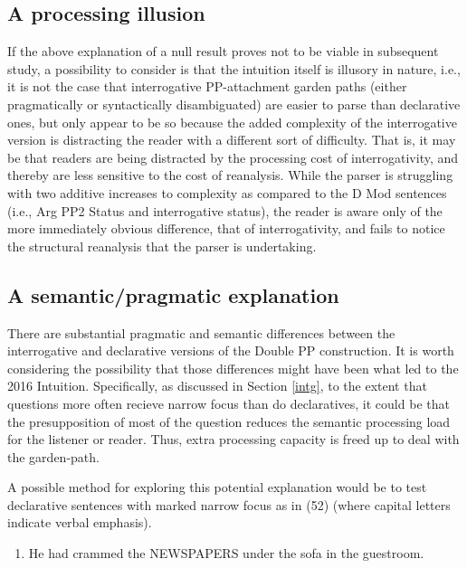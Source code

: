 \documentclass[11pt,oneside]{book}
\providecommand{\tightlist}{%
  \setlength{\itemsep}{0pt}\setlength{\parskip}{0pt}}
\begin{document}
\hypertarget{a-processing-illusion}{%
\subsection{A processing illusion}\label{a-processing-illusion}}

If the above explanation of a null result proves not to be viable in subsequent study, a possibility to consider is that the intuition itself is illusory in nature, i.e., it is not the case that interrogative PP-attachment garden paths (either pragmatically or syntactically disambiguated) are easier to parse than declarative ones, but only appear to be so because the added complexity of the interrogative version is distracting the reader with a different sort of difficulty. That is, it may be that readers are being distracted by the processing cost of interrogativity, and thereby are less sensitive to the cost of reanalysis. While the parser is struggling with two additive increases to complexity as compared to the D Mod sentences (i.e., Arg PP2 Status and interrogative status), the reader is aware only of the more immediately obvious difference, that of interrogativity, and fails to notice the structural reanalysis that the parser is undertaking.

\hypertarget{sem}{%
\subsection{A semantic/pragmatic explanation}\label{sem}}

There are substantial pragmatic and semantic differences between the interrogative and declarative versions of the Double PP construction. It is worth considering the possibility that those differences might have been what led to the 2016 Intuition. Specifically, as discussed in Section \ref{intg}, to the extent that questions more often recieve narrow focus than do declaratives, it could be that the presupposition of most of the question reduces the semantic processing load for the listener or reader. Thus, extra processing capacity is freed up to deal with the garden-path.

A possible method for exploring this potential explanation would be to test declarative sentences with marked narrow focus as in (52) (where capital letters indicate verbal emphasis).

\begin{enumerate}
\def\labelenumi{(\arabic{enumi})}
\setcounter{enumi}{51}
\tightlist
\item
  He had crammed the NEWSPAPERS under the sofa in the guestroom.
\end{enumerate}
\end{document}
